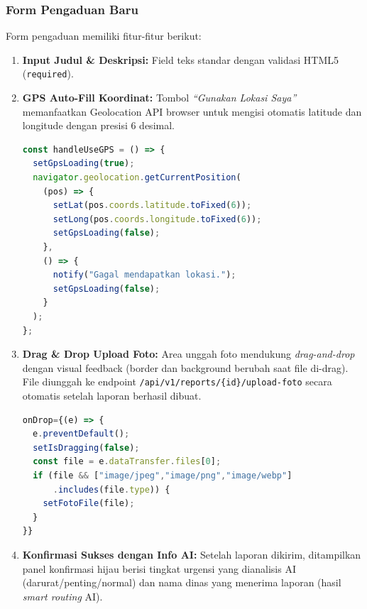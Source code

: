\documentclass[12pt,a4paper]{article}
\begin{document}
\subsubsection{Form Pengaduan Baru}

Form pengaduan memiliki fitur-fitur berikut:

\begin{enumerate}[leftmargin=2em, itemsep=6pt]

  \item \textbf{Input Judul \& Deskripsi:} Field teks standar dengan validasi
        HTML5 (\texttt{required}).

  \item \textbf{GPS Auto-Fill Koordinat:}
        Tombol \textit{``Gunakan Lokasi Saya''} memanfaatkan Geolocation API browser
        untuk mengisi otomatis latitude dan longitude dengan presisi 6 desimal.
        \begin{lstlisting}[language=JavaScript, caption=Handler GPS auto-fill]
const handleUseGPS = () => {
  setGpsLoading(true);
  navigator.geolocation.getCurrentPosition(
    (pos) => {
      setLat(pos.coords.latitude.toFixed(6));
      setLong(pos.coords.longitude.toFixed(6));
      setGpsLoading(false);
    },
    () => {
      notify("Gagal mendapatkan lokasi.");
      setGpsLoading(false);
    }
  );
};
        \end{lstlisting}

  \item \textbf{Drag \& Drop Upload Foto:}
        Area unggah foto mendukung \textit{drag-and-drop} dengan visual feedback
        (border dan background berubah saat file di-drag). File diunggah ke
        endpoint \texttt{/api/v1/reports/\{id\}/upload-foto} secara otomatis
        setelah laporan berhasil dibuat.
        \begin{lstlisting}[language=JavaScript, caption=Drag-drop handler]
onDrop={(e) => {
  e.preventDefault();
  setIsDragging(false);
  const file = e.dataTransfer.files[0];
  if (file && ["image/jpeg","image/png","image/webp"]
      .includes(file.type)) {
    setFotoFile(file);
  }
}}
        \end{lstlisting}

  \item \textbf{Konfirmasi Sukses dengan Info AI:}
        Setelah laporan dikirim, ditampilkan panel konfirmasi hijau berisi
        tingkat urgensi yang dianalisis AI (darurat/penting/normal) dan
        nama dinas yang menerima laporan (hasil \textit{smart routing} AI).

\end{enumerate}
\end{document}
